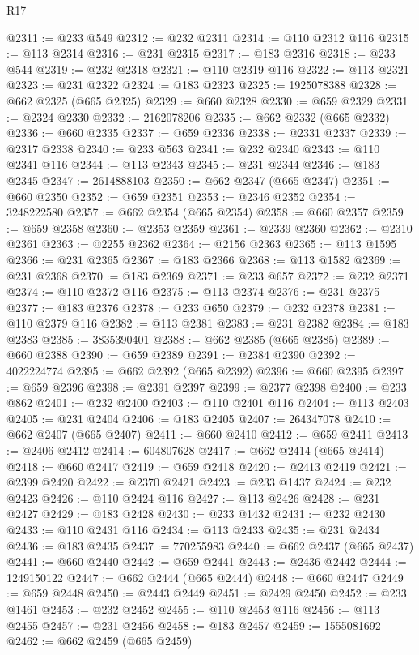 \begin{lexlean}{R17}
\begin{coremodule}
@2311 := @233 @549
@2312 := @232 @2311
@2314 := @110 @2312 @116
@2315 := @113 @2314
@2316 := @231 @2315
@2317 := @183 @2316
@2318 := @233 @544
@2319 := @232 @2318
@2321 := @110 @2319 @116
@2322 := @113 @2321
@2323 := @231 @2322
@2324 := @183 @2323
@2325 := 1925078388
@2328 := @662 @2325 (@665 @2325)
@2329 := @660 @2328
@2330 := @659 @2329
@2331 := @2324 @2330
@2332 := 2162078206
@2335 := @662 @2332 (@665 @2332)
@2336 := @660 @2335
@2337 := @659 @2336
@2338 := @2331 @2337
@2339 := @2317 @2338
@2340 := @233 @563
@2341 := @232 @2340
@2343 := @110 @2341 @116
@2344 := @113 @2343
@2345 := @231 @2344
@2346 := @183 @2345
@2347 := 2614888103
@2350 := @662 @2347 (@665 @2347)
@2351 := @660 @2350
@2352 := @659 @2351
@2353 := @2346 @2352
@2354 := 3248222580
@2357 := @662 @2354 (@665 @2354)
@2358 := @660 @2357
@2359 := @659 @2358
@2360 := @2353 @2359
@2361 := @2339 @2360
@2362 := @2310 @2361
@2363 := @2255 @2362
@2364 := @2156 @2363
@2365 := @113 @1595
@2366 := @231 @2365
@2367 := @183 @2366
@2368 := @113 @1582
@2369 := @231 @2368
@2370 := @183 @2369
@2371 := @233 @657
@2372 := @232 @2371
@2374 := @110 @2372 @116
@2375 := @113 @2374
@2376 := @231 @2375
@2377 := @183 @2376
@2378 := @233 @650
@2379 := @232 @2378
@2381 := @110 @2379 @116
@2382 := @113 @2381
@2383 := @231 @2382
@2384 := @183 @2383
@2385 := 3835390401
@2388 := @662 @2385 (@665 @2385)
@2389 := @660 @2388
@2390 := @659 @2389
@2391 := @2384 @2390
@2392 := 4022224774
@2395 := @662 @2392 (@665 @2392)
@2396 := @660 @2395
@2397 := @659 @2396
@2398 := @2391 @2397
@2399 := @2377 @2398
@2400 := @233 @862
@2401 := @232 @2400
@2403 := @110 @2401 @116
@2404 := @113 @2403
@2405 := @231 @2404
@2406 := @183 @2405
@2407 := 264347078
@2410 := @662 @2407 (@665 @2407)
@2411 := @660 @2410
@2412 := @659 @2411
@2413 := @2406 @2412
@2414 := 604807628
@2417 := @662 @2414 (@665 @2414)
@2418 := @660 @2417
@2419 := @659 @2418
@2420 := @2413 @2419
@2421 := @2399 @2420
@2422 := @2370 @2421
@2423 := @233 @1437
@2424 := @232 @2423
@2426 := @110 @2424 @116
@2427 := @113 @2426
@2428 := @231 @2427
@2429 := @183 @2428
@2430 := @233 @1432
@2431 := @232 @2430
@2433 := @110 @2431 @116
@2434 := @113 @2433
@2435 := @231 @2434
@2436 := @183 @2435
@2437 := 770255983
@2440 := @662 @2437 (@665 @2437)
@2441 := @660 @2440
@2442 := @659 @2441
@2443 := @2436 @2442
@2444 := 1249150122
@2447 := @662 @2444 (@665 @2444)
@2448 := @660 @2447
@2449 := @659 @2448
@2450 := @2443 @2449
@2451 := @2429 @2450
@2452 := @233 @1461
@2453 := @232 @2452
@2455 := @110 @2453 @116
@2456 := @113 @2455
@2457 := @231 @2456
@2458 := @183 @2457
@2459 := 1555081692
@2462 := @662 @2459 (@665 @2459)

\end{coremodule}
\end{lexlean}
